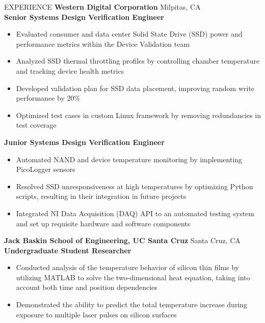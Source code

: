 \documentclass{resume} %
\begin{document}
\begin{rSection}{EXPERIENCE}
\textbf{Western Digital Corporation} \hfill Milpitas, CA\\
\hspace*{4mm}\textbf{Senior Systems Design Verification Engineer}  \hfill {}
 \begin{itemize}[left=2em]
 \itemsep -0.5em \vspace{-0.5em}
     \item Evaluated consumer and data center Solid State Drive (SSD) power and performance metrics within the Device Validation team
     \item Analyzed SSD thermal throttling profiles by controlling chamber temperature and tracking device health metrics
   \item Developed validation plan for SSD data placement, improving random write performance by 20\%
     \item Optimized test cases in custom Linux framework by removing redundancies in test coverage

 \end{itemize}

\hspace*{4mm}\textbf{Junior Systems Design Verification Engineer}  \hfill {}
 \begin{itemize}[left=2em]
 \itemsep -0.5em \vspace{-0.5em}
    \item Automated NAND and device temperature monitoring by implementing PicoLogger sensors
     \item Resolved SSD unresponsiveness at high temperatures by optimizing Python scripts, resulting in their integration in future projects
    \item Integrated NI Data Acquisition (DAQ) API to an automated testing system and set up requisite hardware and software components
 \end{itemize}

\textbf{Jack Baskin School of Engineering, UC Santa Cruz} \hfill Santa Cruz, CA \\
\hspace*{4mm}\textbf{Undergraduate Student Researcher} \hfill {}
 \begin{itemize}[left=2em]
 \itemsep -0.5em \vspace{-0.5em}
    \item Conducted analysis of the temperature behavior of silicon thin films by utilizing MATLAB to solve the two-dimensional heat equation, taking into account both time and position dependencies
    \item Demonstrated the ability to predict the total temperature increase during exposure to multiple laser pulses on silicon surfaces
 \end{itemize}


\end{rSection} 
\end{document}
